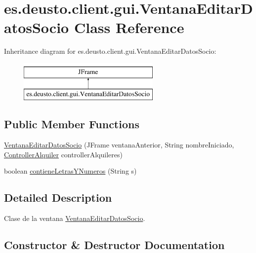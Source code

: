 \hypertarget{classes_1_1deusto_1_1client_1_1gui_1_1_ventana_editar_datos_socio}{}\section{es.\+deusto.\+client.\+gui.\+Ventana\+Editar\+Datos\+Socio Class Reference}
\label{classes_1_1deusto_1_1client_1_1gui_1_1_ventana_editar_datos_socio}
Inheritance diagram for es.\+deusto.\+client.\+gui.\+Ventana\+Editar\+Datos\+Socio\+:\begin{figure}[H]
\begin{center}
\leavevmode
\includegraphics[height=2.000000cm]{classes_1_1deusto_1_1client_1_1gui_1_1_ventana_editar_datos_socio}
\end{center}
\end{figure}
\subsection*{Public Member Functions}
\begin{DoxyCompactItemize}
\item 
\mbox{\hyperlink{classes_1_1deusto_1_1client_1_1gui_1_1_ventana_editar_datos_socio_a2352603aa3af5d459c544700323b5b9d}{Ventana\+Editar\+Datos\+Socio}} (J\+Frame ventana\+Anterior, String nombre\+Iniciado, \mbox{\hyperlink{classes_1_1deusto_1_1client_1_1controllers_1_1_controller_alquiler}{Controller\+Alquiler}} controller\+Alquileres)
\item 
boolean \mbox{\hyperlink{classes_1_1deusto_1_1client_1_1gui_1_1_ventana_editar_datos_socio_ac1c5089b89f94bad21513c94e0761a39}{contiene\+Letras\+Y\+Numeros}} (String s)
\end{DoxyCompactItemize}


\subsection{Detailed Description}
Clase de la ventana \mbox{\hyperlink{classes_1_1deusto_1_1client_1_1gui_1_1_ventana_editar_datos_socio}{Ventana\+Editar\+Datos\+Socio}}. 

\subsection{Constructor \& Destructor Documentation}
\mbox{\label{classes_1_1deusto_1_1client_1_1gui_1_1_ventana_editar_datos_socio_a2352603aa3af5d459c544700323b5b9d}} 
